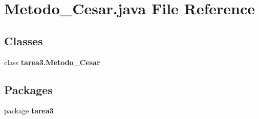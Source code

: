 \section{Metodo\+\_\+\+Cesar.\+java File Reference}
\label{_metodo___cesar_8java}
\subsection*{Classes}
\begin{DoxyCompactItemize}
\item 
class {\bf tarea3.\+Metodo\+\_\+\+Cesar}
\end{DoxyCompactItemize}
\subsection*{Packages}
\begin{DoxyCompactItemize}
\item 
package {\bf tarea3}
\end{DoxyCompactItemize}
